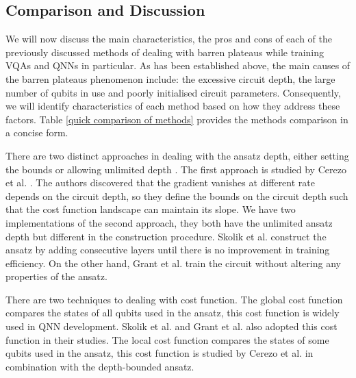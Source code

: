 \subsection{Comparison and Discussion}
We will now discuss the main characteristics, the pros and cons of each of the previously discussed methods of dealing with barren plateaus while training VQAs and QNNs in particular.
As has been established above, the main causes of the barren plateaus phenomenon include: the excessive circuit depth, the large number of qubits in use and poorly initialised circuit parameters.
Consequently, we will identify characteristics of each method based on how they address these factors.
Table \ref{quick comparison of methods} provides the methods comparison in a concise form.

There are two distinct approaches in dealing with the ansatz depth, either setting the bounds \cite{cerezoCostFunctionDependent2021} or allowing unlimited depth \cite{skolikLayerwiseLearningQuantum2021, grantInitializationStrategyAddressing2019}.
The first approach is studied by Cerezo et al. \cite{cerezoCostFunctionDependent2021}. 
The authors discovered that the gradient vanishes at different rate depends on the circuit depth, so they define the bounds on the circuit depth such that the cost function landscape can maintain its slope.
We have two implementations of the second approach, they both have the unlimited ansatz depth but different in the construction procedure. 
Skolik et al. \cite{skolikLayerwiseLearningQuantum2021} construct the ansatz by adding consecutive layers until there is no improvement in training efficiency.
On the other hand, Grant et al. \cite{grantInitializationStrategyAddressing2019} train the circuit without altering any properties of the ansatz.

There are two techniques to dealing with cost function.
The global cost function compares the states of all qubits used in the ansatz, this cost function is widely used in QNN development.
Skolik et al. and Grant et al. also adopted this cost function in their studies.
The local cost function compares the states of some qubits used in the ansatz, this cost function is studied by Cerezo et al. \cite{cerezoCostFunctionDependent2021} in combination with the depth-bounded ansatz.

